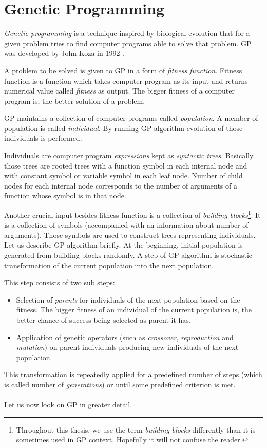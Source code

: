 \documentclass[12pt,a4paper]{report}
\newcommand{\Lets}{Let us\xspace}
\begin{document}
\chapter{Genetic Programming}
\label{GP}

\textit{Genetic programming} is a technique inspired by biological evolution
that for a given problem tries to find computer programs able to solve that problem. 
GP was developed by John Koza in 1992 \cite{koza92}.

A problem to be solved is given to GP in a form of \textit{fitness function}. 
Fitness function is a function which takes computer program as its input and 
returns numerical value called \textit{fitness} as output. 
The bigger fitness of a computer program is, the better solution of a problem.

GP maintains a collection of computer programs called \textit{population}. 
A member of population is called \textit{individual}. 
By running GP algorithm evolution of those individuals is performed.

Individuals are computer program \textit{expressions} kept as \textit{syntactic trees}. 
Basically those trees are rooted trees with a function symbol in each internal node 
and with constant symbol or variable symbol in each leaf node. 
Number of child nodes for each internal node corresponds to the number of arguments of a function whose symbol is in that node.

Another crucial input besides fitness function is a collection of 
\textit{building blocks}\footnote{Throughout this thesis, 
we use the term \textit{building blocks} 
differently than it is sometimes used in GP context. 
Hopefully it will not confuse the reader.}.
It is a collection of symbols (accompanied with an information about number of arguments).
Those symbols are used to construct trees representing individuals.\\

\Lets describe GP algorithm briefly.
At the beginning, initial population is generated from building blocks randomly.
A step of GP algorithm is stochastic transformation of the current population into 	
the next population.

This step consists of two sub steps:
\begin{itemize} 
	\item Selection of \textit{parents} for individuals of the next population based on the fitness.
	      The bigger fitness of an individual of the current population is, 
	      the better chance of success being selected as parent it has.  
	\item Application of genetic operators (such as \textit{crossover}, 
	      \textit{reproduction} and \textit{mutation}) 
		  on parent individuals producing new individuals of the next population.  
\end{itemize}	  
This transformation is repeatedly applied for a predefined number of steps (which is called 
number of \textit{generations}) or until some predefined criterion is met.	
\\\\
\Lets now look on GP in greater detail. 
\end{document}
